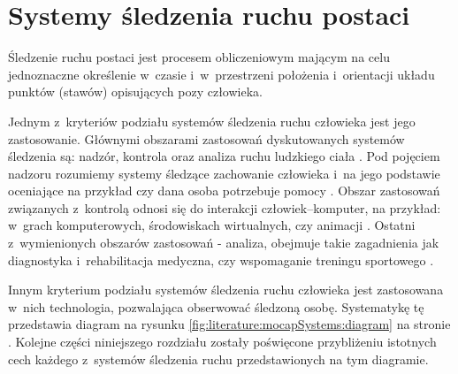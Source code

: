 \section{Systemy śledzenia ruchu postaci} \label{sec:literature:mocapSystems}

Śledzenie ruchu postaci jest procesem obliczeniowym mającym na celu jednoznaczne określenie w~czasie i~w~przestrzeni położenia i~orientacji układu punktów (stawów) opisujących pozy człowieka. 

Jednym z~kryteriów podziału systemów śledzenia ruchu człowieka jest jego zastosowanie. Głównymi obszarami zastosowań dyskutowanych systemów śledzenia są: nadzór, kontrola oraz analiza ruchu ludzkiego ciała \cite{Moeslund2001}. Pod pojęciem nadzoru rozumiemy systemy śledzące zachowanie człowieka i~na jego podstawie oceniające na przykład czy dana osoba potrzebuje pomocy \cite{Kwolek, Kepski2016, Haritaoglu}. Obszar zastosowań związanych z~kontrolą odnosi się do interakcji człowiek--komputer, na przykład: w~grach komputerowych, środowiskach wirtualnych, czy animacji \cite{Moeslund2001a}. Ostatni z~wymienionych obszarów zastosowań - analiza, obejmuje takie zagadnienia jak diagnostyka i~rehabilitacja medyczna, czy wspomaganie treningu sportowego \cite{Neville2010,Noiumkar2013}.

Innym kryterium podziału systemów śledzenia ruchu człowieka jest zastosowana w~nich technologia, pozwalająca obserwować śledzoną osobę. Systematykę tę przedstawia diagram na rysunku \ref{fig:literature:mocapSystems:diagram} na stronie \pageref{fig:literature:mocapSystems:diagram}. Kolejne części niniejszego rozdziału zostały poświęcone przybliżeniu istotnych cech każdego z~systemów śledzenia ruchu przedstawionych na tym diagramie.

